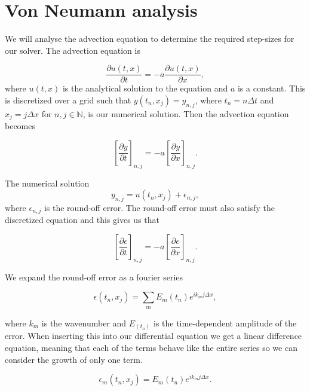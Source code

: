 \documentclass{article}
\begin{document}
\section{Von Neumann analysis}

We will analyse the advection equation to determine the required step-sizes for our solver. The advection equation is

\begin{equation}
    \frac{\partial u(t,x)}{\partial t} = -a \frac{\partial u(t,x)}{\partial x},
\end{equation}
where $u(t,x)$ is the analytical solution to the equation and $a$ is a constant. This is discretized over a grid such that $y(t_n,x_j)=y_{n,j}$, where $t_n = n\Delta t$ and $x_j = j\Delta x$ for $n,j\in\mathbb{N}$, is our numerical solution. Then the advection equation becomes

\begin{equation}
    \left[\frac{\partial y}{\partial t}\right]_{n,j} = -a \left[\frac{\partial y}{\partial x}\right]_{n,j}.
\end{equation}

The numerical solution
\begin{equation}
    y_{n,j} = u(t_n,x_j)+\epsilon_{n,j},
\end{equation}
where $\epsilon_{n,j}$ is the round-off error. The round-off error must also satisfy the discretized equation and this gives us that

\begin{equation}\label{eq:advection_error}
    \left[\frac{\partial \epsilon}{\partial t}\right]_{n,j} = -a \left[\frac{\partial \epsilon}{\partial x}\right]_{n,j}.
\end{equation}

We expand the round-off error as a fourier series

\begin{equation}
    \epsilon(t_n,x_j) = \sum_m E_m(t_n) e^{i k_m j\Delta x},
\end{equation}

where $k_m$ is the wavenumber and $E_(t_n)$ is the time-dependent amplitude of the error. When inserting this into our differential equation we get a linear difference equation, meaning that each of the terms behave like the entire series so we can consider the growth of only one term.

\begin{equation}
    \epsilon_m(t_n,x_j) = E_m(t_n) e^{i k_m j\Delta x}.
\end{equation}
\end{document}
